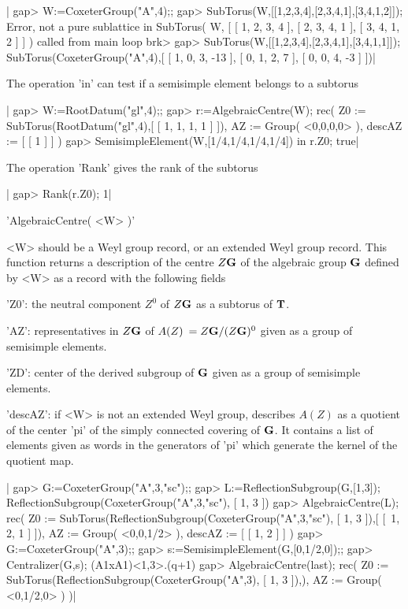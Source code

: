 |    gap> W:=CoxeterGroup("A",4);;
    gap> SubTorus(W,[[1,2,3,4],[2,3,4,1],[3,4,1,2]]);
    Error, not a pure sublattice in
    SubTorus( W, [ [ 1, 2, 3, 4 ], [ 2, 3, 4, 1 ], [ 3, 4, 1, 2 ] ]
     ) called from
    main loop
    brk>
    gap> SubTorus(W,[[1,2,3,4],[2,3,4,1],[3,4,1,1]]);
    SubTorus(CoxeterGroup("A",4),[ [ 1, 0, 3, -13 ], [ 0, 1, 2, 7 ], [ 0,
    0, 4, -3 ] ])|


The operation 'in' can test if a semisimple element belongs to a subtorus\:

|    gap> W:=RootDatum("gl",4);;
    gap> r:=AlgebraicCentre(W);
    rec(
      Z0 := SubTorus(RootDatum("gl",4),[ [ 1, 1, 1, 1 ] ]),
      AZ := Group( <0,0,0,0> ),
      descAZ := [ [ 1 ] ] )
    gap> SemisimpleElement(W,[1/4,1/4,1/4,1/4]) in r.Z0;
    true|

The operation 'Rank' gives the rank of the subtorus\:

|    gap> Rank(r.Z0);
    1|


'AlgebraicCentre( <W> )'

<W>  should be a Weyl group record,  or an extended Weyl group record. This
function  returns a description of the centre $Z{\mathbf G}$ of the algebraic group
${\mathbf G}$ defined by <W> as a record with the following fields\:

'Z0':  the neutral component $Z^0$  of $Z{\mathbf G}$ as a subtorus of ${\mathbf T}$.

'AZ':  representatives in $Z{\mathbf G}$ of $A(Z)\:=Z{\mathbf G}/(Z{\mathbf G})^0$ given as a group
   of semisimple elements.

'ZD':  center  of  the  derived  subgroup  of  ${\mathbf G}$  given  as  a group of
   semisimple elements.

'descAZ':  if <W>  is not  an extended  Weyl group,  describes $A(Z)$  as a
   quotient  of the center 'pi' of  the simply connected covering of ${\mathbf G}$.
   It  contains a list of elements given as words in the generators of 'pi'
   which generate the kernel of the quotient map.

|    gap> G:=CoxeterGroup("A",3,"sc");;
    gap> L:=ReflectionSubgroup(G,[1,3]);
    ReflectionSubgroup(CoxeterGroup("A",3,"sc"), [ 1, 3 ])
    gap> AlgebraicCentre(L);
    rec(
      Z0 :=
       SubTorus(ReflectionSubgroup(CoxeterGroup("A",3,"sc"), [ 1, 3 ]),[ [\
     1, 2, 1 ] ]),
      AZ := Group( <0,0,1/2> ),
      descAZ := [ [ 1, 2 ] ] )
    gap> G:=CoxeterGroup("A",3);;
    gap> s:=SemisimpleElement(G,[0,1/2,0]);;
    gap> Centralizer(G,s);
    (A1xA1)<1,3>.(q+1)
    gap> AlgebraicCentre(last);
    rec(
      Z0 := SubTorus(ReflectionSubgroup(CoxeterGroup("A",3), [ 1, 3 ]),),
      AZ := Group( <0,1/2,0> ) )|

